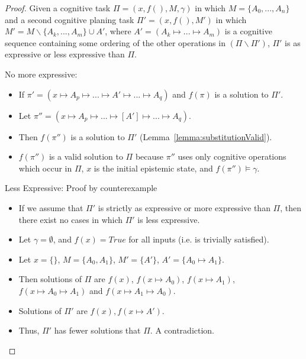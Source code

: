 \begin{proof} \label{proof:aggregateExpressiveness}
Given a cognitive task $\Pi=(x,f(), M, \gamma)$ in which $M=\{A_0,...,A_n\}$ and a second cognitive planing task $\Pi'=(x,f(),M')$ in which $M'= M \smallsetminus \{A_k,...,A_m\} \cup A'$, where $A'=(A_k \longmapsto... \longmapsto A_m)$ is a cognitive sequence containing some ordering of the other operations in $(\Pi \smallsetminus \Pi')$, $\Pi'$ is as expressive or less expressive than $\Pi$.

\item No more expressive:
\begin{itemize}
\item If $\pi' = (x\longmapsto A_p \longmapsto ... \longmapsto A' \longmapsto ... \longmapsto A_q)$ and $f(\pi)$ is a solution to $\Pi'$.
\item Let $\pi'' = (x\longmapsto A_p \longmapsto ... \longmapsto [A'] \longmapsto ... \longmapsto A_q)$.
\item Then $f(\pi'')$ is a solution to $\Pi'$ (Lemma~\ref{lemma:substitutionValid}).
\item $f(\pi'')$ is a valid solution to $\Pi$ because $\pi''$ uses only cognitive operations which occur in $\Pi$, $x$ is the initial epistemic state, and $f(\pi'') \models \gamma$. 
\end{itemize}

\item Less Expressive: Proof by counterexample
\begin{itemize}
\item If we assume that $\Pi'$ is strictly as expressive or more expressive than $\Pi$, then there exist no cases in which $\Pi'$ is less expressive.
\item Let $\gamma = \emptyset$, and $f(x)=True$ for all inputs (i.e. is trivially satisfied).
\item Let $x=\{\}$, $M=\{A_0,A_1\}$, $M'=\{A'\}$, $A'=\{A_0\longmapsto A_1\}$.
\item Then solutions of $\Pi$ are $f(x)$, $f(x \longmapsto A_0)$, $f(x \longmapsto A_1)$, $f(x \longmapsto A_0\longmapsto A_1)$ and $f(x \longmapsto A_1\longmapsto A_0)$.
\item Solutions of $\Pi'$ are $f(x), f(x \longmapsto A')$.
\item Thus, $\Pi'$ has fewer solutions that $\Pi$. A contradiction.
\end{itemize}
\end{proof}

